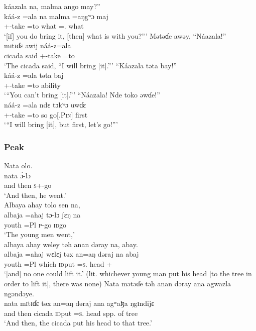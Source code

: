  \medskip
  káazala  na,  malma  ango  may?”\\
 \gll káá-z  =ala     na  malma  =aŋgʷɔ    maj\\
 {\twoS}+{\POT}-take =to  {\PSP}   what  ={\twoS}.{\POSS}  what\\
 \glt ‘[if] you do bring it,  [then] what is with you?”’
 \z
\ea  Mətəɗe  awəy,  “Náazala!”\\                   
 \gll mɪtɪɗɛ  awij náá-z=ala\\
 cicada          said    {\oneS}+{\POT}-take =to\\      
 \glt ‘The cicada said, “I will bring [it].”’
 \z
\ea  “Káazala   təta   bay!”\\
 \gll káá-z  =ala     təta     baj\\
 {\twoS}+{\POT}-take =to  ability  {\NEG}\\
 \glt ‘“You can’t bring [it].”’
 \z
\ea  “Náazala!  Nde  toko  əwɗe!”\\                
 \gll náá-z  =ala ndɛ tɔkʷɔ     uwɗɛ\\
 {\oneS}+{\POT}-take =to  so  go[{\IMP}.\textsc{Pin}]    first\\
 \glt ‘“I will bring [it], but first, let’s go!”’
 \z
 \subsubsection*{Peak}
\ea  Nata  olo.\\
 \gll nata      \`ɔ-lɔ\\
 {and then}     \textsc{s}+{\PFV}-go  \\
 \glt ‘And then, he went.’\\
 \z
\ea  Albaya  ahay  tolo  sen  na,    \\
\gll albaja    =ahaj   tɔ-lɔ    ʃɛŋ      na\\
 youth     =Pl      \textsc{p}-go   \textsc{id}go   {\PSP}  \\
 \glt ‘The young men went,’\\
 
 \medskip
 albaya  ahay  weley  təh  anan  dəray  na, abay.\\
 \gll albaja   =ahaj   wɛlɛj  təx     an=aŋ         dəraj   na  abaj\\
 youth    =Pl    which   \textsc{id}put   {\DAT}=\textsc{s}.{\IO}   head   {\PSP}   {{\EXT}+{\NEG}}\\
 \glt ‘[and] no one could lift it.’ (lit. whichever young man put his head [to the tree in order to lift it], there was none)
 \z
\ea  Nata  mətəɗe  təh  anan  dəray  ana  agwazla  ngəndəye.\\
 \gll nata  mɪtɪɗɛ  təx  an=aŋ    dəraj  ana  agʷaɮa  ŋgɪndijɛ\\
 {and then}   cicada   \textsc{id}put    {\DAT}=\textsc{s}.{\IO}   head   {\DAT}  {spp. of tree}    {\DEM}\\
 \glt ‘And then,  the cicada put his head to that tree.’
 \z
 
